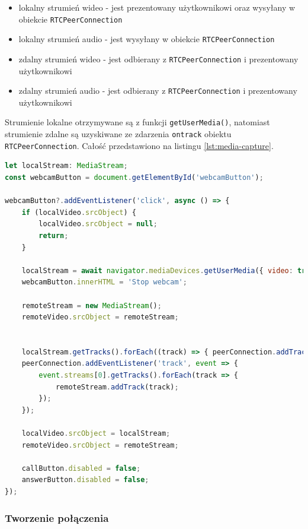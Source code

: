 \begin{itemize}
    \item lokalny strumień wideo - jest prezentowany użytkownikowi oraz wysyłany w obiekcie
          \verb|RTCPeerConnection|
    \item lokalny strumień audio - jest wysyłany w obiekcie \verb|RTCPeerConnection|
    \item zdalny strumień wideo - jest odbierany z \verb|RTCPeerConnection| i prezentowany
          użytkownikowi
    \item zdalny strumień audio - jest odbierany z \verb|RTCPeerConnection| i prezentowany
          użytkownikowi
\end{itemize}

Strumienie lokalne otrzymywane są z funkcji \verb|getUserMedia()|, natomiast strumienie zdalne są
uzyskiwane ze zdarzenia \verb|ontrack| obiektu \verb|RTCPeerConnection|. Całość przedstawiono na
listingu \ref{lst:media-capture}.

\begin{lstlisting}[language=Javascript,label=lst:media-capture, caption=Przechwytywanie wideo i audio z komputera,
basicstyle=\footnotesize \ttfamily, showtabs=true, tabsize=4]
let localStream: MediaStream;
const webcamButton = document.getElementById('webcamButton');

webcamButton?.addEventListener('click', async () => {
    if (localVideo.srcObject) {
        localVideo.srcObject = null;
        return;
    }

    localStream = await navigator.mediaDevices.getUserMedia({ video: true, audio: true, });
    webcamButton.innerHTML = 'Stop webcam';

    remoteStream = new MediaStream();
    remoteVideo.srcObject = remoteStream;


    localStream.getTracks().forEach((track) => { peerConnection.addTrack(track, localStream); });
    peerConnection.addEventListener('track', event => {
        event.streams[0].getTracks().forEach(track => {
            remoteStream.addTrack(track);
        });
    });

    localVideo.srcObject = localStream;
    remoteVideo.srcObject = remoteStream;

    callButton.disabled = false;
    answerButton.disabled = false;
});
\end{lstlisting}

\subsubsection{Tworzenie połączenia}

